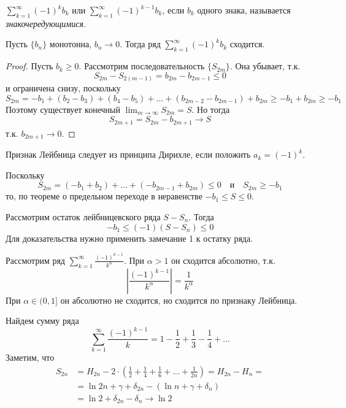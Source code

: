 \begin{Def}
	$\sum_{k=1}^{\infty} (-1)^k b_k$ или $\sum_{k=1}^{\infty} (-1)^{k - 1} b_k$, если $b_k$ одного знака, называется \textit{знакочередующимися}.   
\end{Def}

\begin{Thm}
	Пусть $\{b_n\}$ монотонна, $b_n \to 0$. Тогда ряд $\sum_{k=1}^{\infty} (-1)^{k} b_k$ сходится. 
\end{Thm}

\begin{proof}
	Пусть $b_k \geqslant 0$. Рассмотрим последовательность $\{S_{2m}\}$. Она убывает, т.к.
	\[S_{2m} - S_{2(m - 1)} = b_{2m} - b_{2m - 1} \leqslant 0\]
	и ограничена снизу, поскольку
	\[S_{2m} = -b_1 + (b_2 - b_3) + (b_4 - b_5) + ... + (b_{2m - 2} - b_{2m - 1}) + b_{2m} \geqslant -b_1 + b_{2m} \geqslant -b_1\]	
	Поэтому существует конечный $\lim_{m \to \infty} S_{2m} = S$. Но тогда
	\[S_{2m + 1} = S_{2m} - b_{2m + 1} \xrightarrow[]{} S\]
	т.к. $b_{2m + 1} \to 0$.
\end{proof}

\begin{Rem}
	Признак Лейбница следует из принципа Дирихле, если положить $a_k = (-1)^k$. 
\end{Rem}

\begin{Rem}
	Поскольку
	\[S_{2m} = (-b_1 + b_2) + ... + (- b_{2m - 1} + b_{2m}) \leqslant 0 \quad \text{и} \quad S_{2m} \geqslant -b_1\]
	то, по теореме о предельном переходе в неравенстве $-b_1 \leqslant S \leqslant 0$.  
\end{Rem}

\begin{Rem}
	Рассмотрим остаток лейбницевского ряда $S - S_n$. Тогда
	\[-b_1 \leqslant (-1) (S - S_n) \leqslant 0\]
	Для доказательства нужно применить замечание 1 к остатку ряда.
\end{Rem}

\begin{Example}
	Рассмотрим ряд $\sum_{k=1}^{\infty} \frac{(-1)^{k - 1}}{k^\alpha}$. При $\alpha > 1$ он сходится абсолютно, т.к.
	\[\left| \frac{(-1)^{k - 1}}{k^\alpha}\right| = \frac{1}{k^\alpha}\]
	При $\alpha \in (0, 1]$ он абсолютно не сходится, но сходится по признаку Лейбница.
\end{Example}

\begin{Example}
	Найдем сумму ряда
	\[\sum_{k=1}^{\infty} \frac{(-1)^{k - 1}}{k} = 1 - \frac{1}{2} + \frac{1}{3} - \frac{1}{4} + ...\]
	Заметим, что 
	\begin{align*}
		S_{2n} &= H_{2n} - 2 \cdot \left(\frac{1}{2} + \frac{1}{4} + \frac{1}{6} + ... + \frac{1}{2n}\right) = H_{2n} - H_n = \\
		&= \ln 2n + \gamma + \delta_{2n} - (\ln n + \gamma + \delta_n) \\
		&= \ln 2 + \delta_{2n} - \delta_n \to \ln 2
	\end{align*}   
\end{Example}

